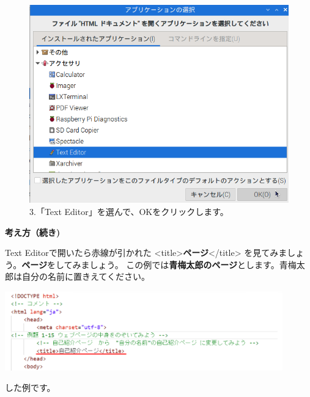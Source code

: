 \documentclass[a4paper,12pt]{jarticle}
\begin{document}
\begin{figure}[ht]
\begin{minipage}{\textwidth}
    \begin{minipage}{0.45\linewidth}
      \includegraphics[width=\linewidth]{textbook-img1042.png}\\
      3.「Text Editor」を選んで、OKをクリックします。
    \end{minipage}
  \end{minipage}


\end{figure}

\clearpage
\textbf{考え方（続き)}

Text Editorで開いたら赤線が引かれた
{\textless}title{\textgreater}\textbf{ページ}{\textless}/title{\textgreater}
を見てみましょう。\textbf{ページ}をしてみましょう。
この例では\textbf{青梅太郎のページ}とします。青梅太郎は自分の名前に置きえてください。


\centering
\includegraphics[width=0.9\textwidth]{textbook-img146.png}



\bigskip

\flushleft
{}した例です。
\end{document}
